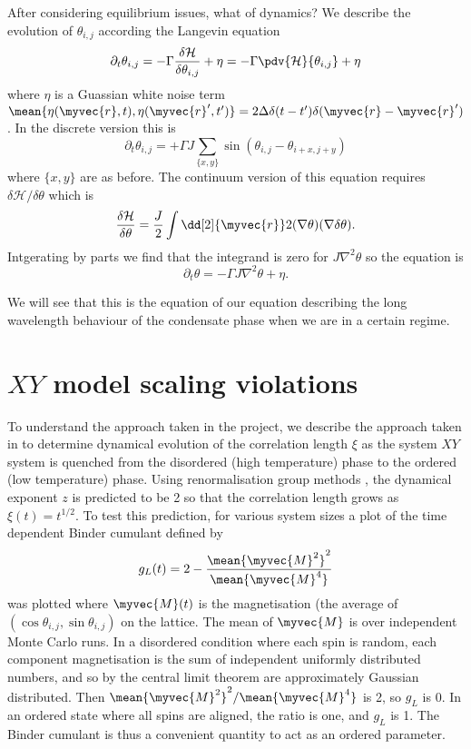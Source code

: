After considering equilibrium issues, what of dynamics? We describe \cite{2016PhRvB..94j4521S} the evolution of $\theta_{i,j}$ according the Langevin equation 
\[
\partial_t \theta_{i,j} = -\Gamma \frac{\delta \mathcal{H}}{\delta \theta_{i,j}} + \eta=-\Gamma \pdv{\mathcal{H}}{\theta_{i,j}} + \eta
\]
where $\eta$ is a Guassian white noise term $\mean{\eta(\myvec{r},t), \eta(\myvec{r}',t')} = 2 \Delta \delta(t-t')\delta(\myvec{r}-\myvec{r}')$. In the discrete version this is
\[
\partial_t \theta_{i,j} = +\Gamma J \sum_{\{x,y\}} \sin(\theta_{i,j} -\theta_{i+x,j+y})
\]
where $\{x,y\}$ are as before. The continuum version of this equation requires $\delta \mathcal{H} / \delta \theta$ which is 
\[
\frac{\delta \mathcal{H}}{\delta \theta} = \frac{J}{2} \int \dd[2]{\myvec{r}}  2 (\nabla \theta)(\nabla \delta \theta).
\]
Intgerating by parts we find that the integrand is zero for $J\nabla^2 \theta$ so the equation is 
\[
\partial_t \theta = -\Gamma J \nabla^2 \theta + \eta.
\]

We will see that this is the equation of our equation describing the long wavelength behaviour of the condensate phase when we are in a certain regime.

\section{$XY$ model scaling violations}

To understand the approach taken in the project, we describe the approach taken in \cite{PhysRevLett.84.1503} to determine dynamical evolution of the correlation length $\xi$ as the system $XY$ system is quenched from the disordered (high temperature) phase to the ordered (low temperature) phase. Using renormalisation group methods \cite{Janssen1989}, the dynamical exponent $z$ is predicted to be 2 so that the correlation length grows as $\xi(t) = t^{1/2}.$ 
To test this prediction, for various system sizes a plot of the time dependent Binder cumulant defined by 
\[
g_L(t) = 2 - \frac{\mean{\myvec{M}^2}^2}{\mean{\myvec{M}^4}}
\]
was plotted where $\myvec{M}(t)$ is the magnetisation (the average of $(\cos \theta_{i,j},\sin\theta_{i,j})$ on the lattice. The mean of $\myvec{M}$ is over independent Monte Carlo runs. In a disordered condition where each spin is random, each component magnetisation is the sum of independent uniformly distributed numbers, and so by the central limit theorem are approximately Gaussian distributed. Then $\mean{\myvec{M}^2}^2/\mean{\myvec{M}^4}$ is 2, so $g_L$ is 0. In an ordered state where all spins are aligned, the ratio is one, and $g_L$ is 1. The Binder cumulant is thus a convenient quantity to act as an ordered parameter.

